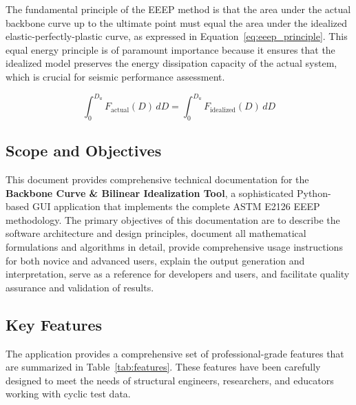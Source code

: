 \documentclass[11pt,a4paper]{article}
\begin{document}
The fundamental principle of the EEEP method is that the area under the actual backbone curve up to the ultimate point must equal the area under the idealized elastic-perfectly-plastic curve, as expressed in Equation~\ref{eq:eeep_principle}. This equal energy principle is of paramount importance because it ensures that the idealized model preserves the energy dissipation capacity of the actual system, which is crucial for seismic performance assessment.

\begin{equation}
\int_0^{D_u} F_{\text{actual}}(D) \, dD = \int_0^{D_u} F_{\text{idealized}}(D) \, dD
\label{eq:eeep_principle}
\end{equation}

\subsection{Scope and Objectives}

This document provides comprehensive technical documentation for the \textbf{Backbone Curve \& Bilinear Idealization Tool}, a sophisticated Python-based GUI application that implements the complete ASTM E2126 EEEP methodology. The primary objectives of this documentation are to describe the software architecture and design principles, document all mathematical formulations and algorithms in detail, provide comprehensive usage instructions for both novice and advanced users, explain the output generation and interpretation, serve as a reference for developers and users, and facilitate quality assurance and validation of results.

\subsection{Key Features}

The application provides a comprehensive set of professional-grade features that are summarized in Table~\ref{tab:features}. These features have been carefully designed to meet the needs of structural engineers, researchers, and educators working with cyclic test data.
\end{document}
